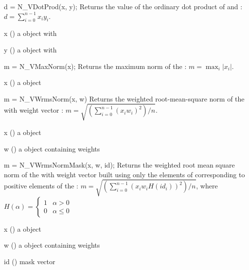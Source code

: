 {
  d = N\_VDotProd(x, y);
}
{
  Returns the value of the ordinary dot product of  and :
  $d=\sum_{i=0}^{n-1} x_i y_i$.
}
{
  \begin{args}[x]
  \item[x] () a {\nvector} object
    with 
  \item[y] () a {\nvector} object
    with 
  \end{args}
}
{
}
{}

{
  m = N\_VMaxNorm(x);
}
{
  Returns the maximum norm of the  :
  $m = \max_{i} | x_i |$.
}
{
  \begin{args}[x]
  \item[x] () a {\nvector} object
  \end{args}
}
{
}
{}

{
  m = N\_VWrmsNorm(x, w)
}
{
  Returns the weighted root-mean-square norm of the   with
   weight vector :
  $m = \sqrt{\left( \sum_{i=0}^{n-1} (x_i w_i)^2 \right) / n}$.
}
{
  \begin{args}[x]
  \item[x] () a {\nvector} object
  \item[w] () a {\nvector} object containing weights
  \end{args}
}
{
}
{}

{
  m = N\_VWrmsNormMask(x, w, id);
}
{
  Returns the weighted root mean square norm of the   with
   weight vector  built using only
  the elements of  corresponding to
  positive elements of the  :
  $m = \sqrt{\left( \sum_{i=0}^{n-1} (x_i w_i H(id_i))^2 \right) / n}$,
  where
  $
  H(\alpha) =
  \begin{cases}
  1 & \alpha > 0 \\
  0 & \alpha \leq 0
  \end{cases}
  $
}
{
  \begin{args}[x]
  \item[x] () a {\nvector} object
  \item[w] () a {\nvector} object containing weights
  \item[id] () mask vector
  \end{args}
}
{
}
{}

